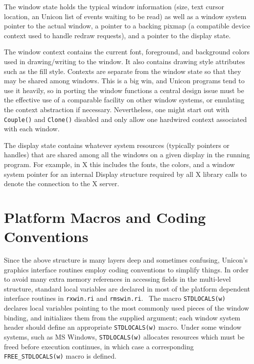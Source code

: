 The window state holds the typical window information (size, text
cursor location, an Unicon list of events waiting to be read) as well
as a window system pointer to the actual window, a pointer to a
backing pixmap (a {\textquotedbl}compatible device
context{\textquotedbl} used to handle redraw requests), and a pointer
to the display state.

The window context contains the current font, foreground, and
background colors used in drawing/writing to the window.  It also
contains drawing style attributes such as the fill style. Contexts are
separate from the window state so that they may be shared among
windows. This is a big win, and Unicon programs tend to use it
heavily, so in porting the window functions a central design issue
must be the effective use of a comparable facility on other window
systems, or emulating the context abstraction if
necessary. Nevertheless, one might start out with \texttt{Couple()}
and \texttt{Clone()} disabled and only allow one hardwired context
associated with each window.

The display state contains whatever system resources (typically
pointers or handles) that are shared among all the windows on a given
display in the running program. For example, in X this includes the
fonts, the colors, and a window system pointer for an internal Display
structure required by all X library calls to denote the connection to
the X server.


\section{Platform Macros and Coding Conventions}

Since the above structure is many layers deep and sometimes confusing,
Unicon's graphics interface routines employ coding conventions to
simplify things. In order to avoid many extra memory references in
accessing fields in the multi-level structure,
{\textquotedbl}standard{\textquotedbl} local variables are declared in
most of the platform dependent interface routines in \texttt{rxwin.ri}
and \texttt{rmswin.ri}. \ The macro \texttt{STDLOCALS(w)} declares
local variables pointing to the most commonly used pieces of the
window binding, and initializes them from the supplied argument; each
window system header should define an appropriate
\texttt{STDLOCALS(w)} macro. Under some window systems, such as MS
Windows, \texttt{STDLOCALS(w)} allocates resources which must be freed
before execution continues, in which case a corresponding
\texttt{FREE\_STDLOCALS(w)} macro is defined.

